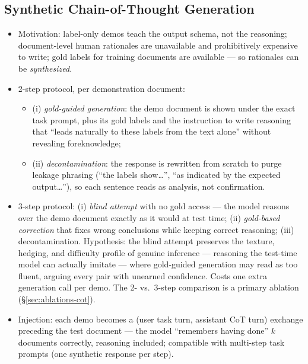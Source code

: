 \documentclass[11pt]{article}
\begin{document}
\subsection{Synthetic Chain-of-Thought Generation}
\label{sec:synthcot}
\begin{itemize}
  \item Motivation: label-only demos teach the output schema, not the
        reasoning; document-level human rationales are unavailable and
        prohibitively expensive to write; gold labels for training documents
        are available --- so rationales can be \emph{synthesized}.
  \item 2-step protocol, per demonstration document:
        \begin{itemize}
          \item (i) \emph{gold-guided generation}: the demo document is shown
                under the exact task prompt, plus its gold labels and the
                instruction to write reasoning that ``leads naturally to these
                labels from the text alone'' without revealing foreknowledge;
          \item (ii) \emph{decontamination}: the response is rewritten from
                scratch to purge leakage phrasing (``the labels show\dots'',
                ``as indicated by the expected output\dots''), so each sentence
                reads as analysis, not confirmation.
        \end{itemize}
  \item 3-step protocol: (i) \emph{blind attempt} with no gold access ---
        the model reasons over the demo document exactly as it would at test
        time; (ii) \emph{gold-based correction} that fixes wrong conclusions
        while keeping correct reasoning; (iii) decontamination.
        Hypothesis: the blind attempt preserves the texture, hedging, and
        difficulty profile of genuine inference --- reasoning the test-time
        model can actually imitate --- where gold-guided generation may read
        as too fluent, arguing every pair with unearned confidence.
        Costs one extra generation call per demo. The 2- vs.\ 3-step
        comparison is a primary ablation (\S\ref{sec:ablations-cot}).
  \item Injection: each demo becomes a (user task turn, assistant CoT turn)
        exchange preceding the test document --- the model ``remembers having
        done'' $k$ documents correctly, reasoning included; compatible with
        multi-step task prompts (one synthetic response per step).

\end{itemize}
\end{document}
